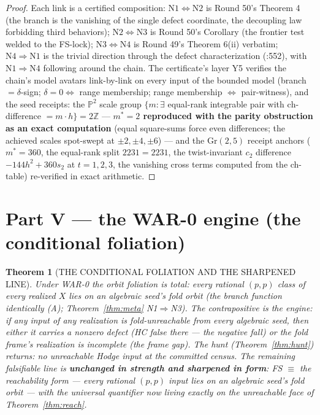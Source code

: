 \documentclass[11pt]{article}
\newtheorem{theorem}{Theorem}[section]
\begin{document}
\begin{proof}
Each link is a certified composition: $\mathrm{N1}\iff\mathrm{N2}$ is Round 50's Theorem 4 (the branch is the vanishing of the single defect coordinate, the decoupling law forbidding third behaviors); $\mathrm{N2}\iff\mathrm{N3}$ is Round 50's Corollary (the frontier test welded to the FS-lock); $\mathrm{N3}\iff\mathrm{N4}$ is Round 49's Theorem 6(ii) verbatim; $\mathrm{N4}\Rightarrow\mathrm{N1}$ is the trivial direction through the defect characterization (:552), with $\mathrm{N1}\Rightarrow\mathrm{N4}$ following around the chain. The certificate's layer Y5 verifies the chain's model avatars link-by-link on every input of the bounded model (branch $=\delta$-sign; $\delta=0\iff$ range membership; range membership $\iff$ pair-witness), and the seed receipts: the $\mathbb P^2$ scale group $\{m:\exists$ equal-rank integrable pair with $\mathrm{ch}$-difference $=m\cdot h\}=2\mathbb Z$ --- \textbf{$m^*=2$ reproduced with the parity obstruction as an exact computation} (equal square-sums force even differences; the achieved scales spot-swept at $\pm2,\pm4,\pm6$) --- and the $\mathrm{Gr}(2,5)$ receipt anchors ($m^*=360$, the equal-rank split $2231{=}2231$, the twist-invariant $c_2$ difference $-144h^2+360s_2$ at $t=1,2,3$, the vanishing cross terms computed from the ch-table) re-verified in exact arithmetic. \qedhere
\end{proof}

\section{Part V --- the WAR-0 engine (the conditional foliation)}

\begin{theorem}[THE CONDITIONAL FOLIATION AND THE SHARPENED LINE]
\label{thm:war0}
Under WAR-0 the orbit foliation is \emph{total}: every rational $(p,p)$ class of every realized $X$ lies on an algebraic seed's fold orbit (the branch function identically (A); Theorem~\ref{thm:meta} N1$\Rightarrow$N3). The contrapositive is the engine: if any input of any realization is fold-unreachable from every algebraic seed, then either it carries a nonzero defect (HC false there --- the negative fall) or the fold frame's realization is incomplete (the frame gap). The hunt (Theorem~\ref{thm:hunt}) returns: no unreachable Hodge input at the committed census. The remaining falsifiable line is \textbf{unchanged in strength and sharpened in form}: FS $\equiv$ the \emph{reachability} form --- every rational $(p,p)$ input lies on an algebraic seed's fold orbit --- with the universal quantifier now living exactly on the unreachable face of Theorem~\ref{thm:reach}.
\end{theorem}
\end{document}
